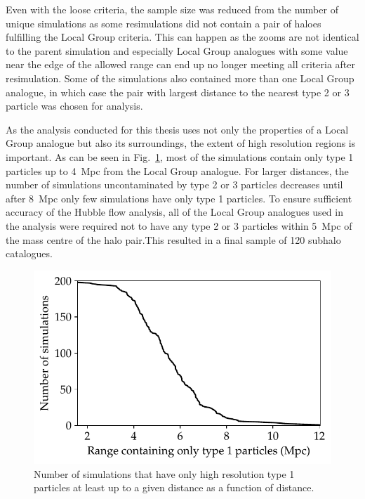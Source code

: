 \documentclass[english, oneside]{HYgradu}
\begin{document}
Even with the loose criteria, the sample size was reduced from the number of unique simulations as some resimulations did not contain a pair of haloes fulfilling the Local Group criteria. This can happen as the zooms are not identical to the parent simulation and especially Local Group analogues with some value near the edge of the allowed range can end up no longer meeting all criteria after resimulation. Some of the simulations also contained more than one Local Group analogue, in which case the pair with largest distance to the nearest type 2 or 3 particle was chosen for analysis.

As the analysis conducted for this thesis uses not only the properties of a Local Group analogue but also its surroundings, the extent of high resolution regions is important. As can be seen in Fig.\ \ref{fig:uncontaminatedDistances}, most of the simulations contain only type 1 particles up to 4~Mpc from the Local Group analogue. For larger distances, the number of simulations uncontaminated by type 2 or 3 particles decreases until after 8~Mpc only few simulations have only type 1 particles. To ensure sufficient accuracy of the Hubble flow analysis, all of the Local Group analogues used in the analysis were required not to have any type 2 or 3 particles within 5~Mpc of the mass centre of the halo pair.This resulted in a final sample of 120 subhalo catalogues.


\begin{figure}
    \centering
    \includegraphics{kuvat/uncontaminatedDistances.pdf}
    \caption{Number of simulations that have only high resolution type 1 particles at least up to a given distance as a function of distance.}\label{fig:uncontaminatedDistances}
\end{figure}
\end{document}
